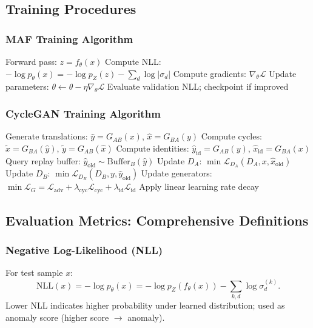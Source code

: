 \documentclass[conference]{IEEEtran}
\begin{document}
\subsection{Training Procedures}
\subsubsection{MAF Training Algorithm}
\begin{algorithmic}
    \STATE Forward pass: $z = f_{\theta}(x)$
    \STATE Compute NLL: $-\log p_{\theta}(x) = -\log p_Z(z) - \sum_d \log |\sigma_d|$
    \STATE Compute gradients: $\nabla_{\theta} \mathcal{L}$
    \STATE Update parameters: $\theta \leftarrow \theta - \eta \nabla_{\theta} \mathcal{L}$
  \ENDFOR
  \STATE Evaluate validation NLL; checkpoint if improved
\ENDFOR
\end{algorithmic}

\subsubsection{CycleGAN Training Algorithm}
\begin{algorithmic}
    \STATE Generate translations: $\hat{y} = G_{AB}(x)$, $\hat{x} = G_{BA}(y)$
    \STATE Compute cycles: $\tilde{x} = G_{BA}(\hat{y})$, $\tilde{y} = G_{AB}(\hat{x})$
    \STATE Compute identities: $\hat{y}_{\text{id}} = G_{AB}(y)$, $\hat{x}_{\text{id}} = G_{BA}(x)$
    \STATE Query replay buffer: $\hat{y}_{\text{old}} \sim \text{Buffer}_B(\hat{y})$
    \STATE Update $D_A$: $\min \mathcal{L}_{D_A}(D_A, x, \hat{x}_{\text{old}})$
    \STATE Update $D_B$: $\min \mathcal{L}_{D_B}(D_B, y, \hat{y}_{\text{old}})$
    \STATE Update generators: $\min \mathcal{L}_G = \mathcal{L}_{\text{adv}} + \lambda_{\text{cyc}} \mathcal{L}_{\text{cyc}} + \lambda_{\text{id}} \mathcal{L}_{\text{id}}$
  \ENDFOR
    \STATE Apply linear learning rate decay
  \ENDIF
\ENDFOR
\end{algorithmic}

\subsection{Evaluation Metrics: Comprehensive Definitions}
\subsubsection{Negative Log-Likelihood (NLL)}
For test sample $x$:
\begin{equation}
\text{NLL}(x) = -\log p_{\theta}(x) = -\log p_Z(f_{\theta}(x)) - \sum_{k,d} \log \sigma^{(k)}_d.
\end{equation}
Lower NLL indicates higher probability under learned distribution; used as anomaly score (higher score $\to$ anomaly).
\end{document}
